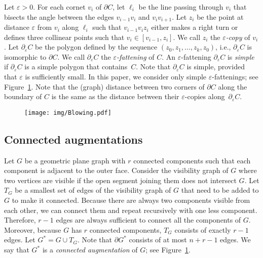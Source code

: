 \documentclass[a4paper, 11pt]{article}
\begin{document}
Let $\varepsilon >0$. For each cornet $v_i$ of $\partial C$,
let $\ell_i$ be the line passing through $v_i$ that bisects the angle between the edges $v_{i-1}v_i$ and $v_i v_{i+1}$.
Let $z_i$ be the point at distance $\varepsilon$ from $v_i$ along $\ell_i$ such that $v_{i-1} v_i z_i$ either makes a right turn or defines three collinear points such that $v_i\in [v_{i-1}, z_i]$. We call $z_i$ the \emph{$\varepsilon$-copy} of $v_i$.
Let $\partial_\varepsilon C$ be the polygon defined by the sequence $(z_0, z_1, \ldots, z_k, z_0)$, i.e., $\partial_\varepsilon C$ is isomorphic to $\partial C$. We call $\partial_\varepsilon C$ the \emph{$\varepsilon$-fattening} of $C$.
An $\varepsilon$-fattening $\partial_\varepsilon C$ is \emph{simple} if $\partial_\varepsilon C$  is a simple polygon that contains~$C$.
Note that $\partial_\varepsilon C$ is simple, provided that $\varepsilon$ is sufficiently small. In this paper, we consider only simple $\varepsilon$-fattenings; see Figure~\ref{fig:Blowing}. Note that the (graph) distance between two corners of $\partial C$ along the boundary of $C$ is the same as the distance between their $\varepsilon$-copies along~$\partial_\varepsilon C$.

\begin{figure}[tb]
\centering
\texttt{[image: img/Blowing.pdf]}
\caption{\small }
\label{fig:Blowing}
\end{figure}

\subsection{Connected augmentations}\label{section: connected augmentations}
Let $G$ be a geometric plane graph with $r$ connected components such that each component is adjacent to the outer face.
Consider the visibility graph of $G$ where two vertices are visible if the open segment joining them does not intersect $G$.
Let $T_G$ be a smallest set of edges of the visibility graph of $G$ that need to be added to $G$ to make it connected.
Because there are always two components visible from each other, we can connect them and repeat recursively with one less component. Therefore, $r-1$ edges are always sufficient to connect all the components of $G$. Moreover, because $G$ has $r$ connected components, $T_G$ consists of exactly $r-1$ edges.
Let $G^* = G\cup T_G$. Note that $\partial G^*$ consists of at most  $n+r-1$ edges.
We say that $G^*$ is a \emph{connected augmentation} of $G$; see Figure~\ref{fig:Blowing}.
\end{document}
